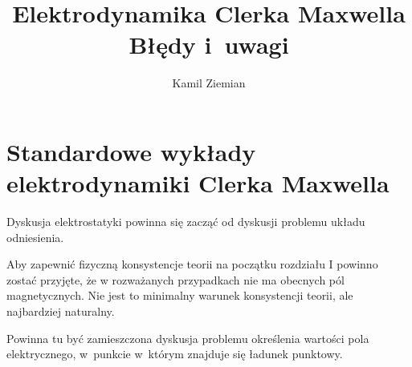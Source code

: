 \documentclass[a4paper,11pt]{article}
\title{Elektrodynamika Clerka Maxwella \\
  {\Large Błędy i~uwagi}}
\author{Kamil Ziemian}
\begin{document}





\maketitle %





\section{Standardowe wykłady elektrodynamiki Clerka Maxwella}

\vspace{\spaceTwo}





\vspace{0em}



\vspace{0em}


\noindent
Dyskusja elektrostatyki powinna się zacząć od dyskusji problemu układu
odniesienia.

\vspace{\spaceFour}





\noindent
Aby zapewnić fizyczną konsystencje teorii na początku rozdziału I
powinno zostać przyjęte, że w rozważanych przypadkach nie ma obecnych
pól magnetycznych. Nie jest to minimalny warunek konsystencji teorii,
ale najbardziej naturalny.

\vspace{\spaceFour}






\noindent
{} Powinna tu być zamieszczona dyskusja problemu określenia wartości
pola elektrycznego, w~punkcie w~którym znajduje się ładunek punktowy.
\end{document}
